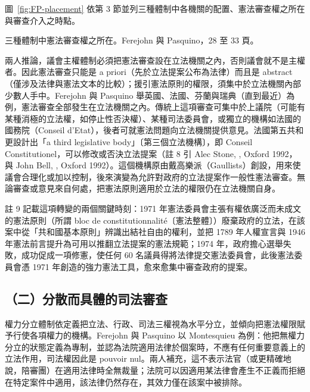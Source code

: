 圖~\ref{fig:FP-placement} 依第 3 節並列三種體制中各機關的配置、憲法審查權之所在與審查介入之時點。

\begin{qafigure}[三種體制中憲法審查權之所在]{三種體制中憲法審查權之所在。Ferejohn 與 Pasquino，28 至 33 頁。\label{fig:FP-placement}}

\end{qafigure}

兩人推論，議會主權體制必須把憲法審查設在立法機關之內，否則議會就不是主權者。因此憲法審查只能是 a priori（先於立法提案公布為法律）而且是 abstract（僅涉及法律與憲法文本的比較）；援引憲法原則的權限，須集中於立法機關內部少數人手中。Ferejohn 與 Pasquino 舉英國、法國、芬蘭與瑞典（直到最近）為例，憲法審查全部發生在立法機關之內。傳統上這項審查可集中於上議院（可能有某種消極的立法權，如停止性否決權）、某種司法委員會，或獨立的機構如法國的國務院（Conseil d'Etat），後者可就憲法問題向立法機關提供意見。法國第五共和更設計出「a third legislative body」〔第三個立法機構〕，即 Conseil Constitutionel，可以修改或否決立法提案（註 8 引 Alec Stone, , Oxford 1992，與 John Bell, , Oxford 1992）。這個機構原由戴高樂派（Gaullists）創設，用來使議會合理化或加以控制，後來演變為允許對政府的立法提案作一般性憲法審查。無論審查或意見來自何處，把憲法原則適用於立法的權限仍在立法機關自身。

註 9 記載這項轉變的兩個關鍵時刻：1971 年憲法委員會主張有權依廣泛而未成文的憲法原則（所謂 bloc de constitutionnalité〔憲法整體〕）廢棄政府的立法，在該案中從「共和國基本原則」辨識出結社自由的權利，並把 1789 年人權宣言與 1946 年憲法前言提升為可用以推翻立法提案的憲法規範；1974 年，政府擔心選舉失敗，成功促成一項修憲，使任何 60 名議員得將法律提交憲法委員會，此後憲法委員會憑 1971 年創造的強力憲法工具，愈來愈集中審查政府的提案。

\subsection{（二）分散而具體的司法審查}

權力分立體制依定義把立法、行政、司法三權視為水平分立，並傾向把憲法權限賦予行使各項權力的機構。Ferejohn 與 Pasquino 以 Montesquieu 為例：他把無權力分立的狀態定義為專制，並認為法院適用法律於個案時，不應有任何重要意義上的立法作用，司法權因此是 pouvoir nul。兩人補充，這不表示法官（或更精確地說，陪審團）在適用法律時全無裁量；法院可以因適用某法律會產生不正義而拒絕在特定案件中適用，該法律仍然存在，其效力僅在該案中被排除。

